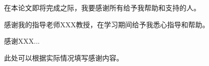 \makeacknowledgements

在本论文即将完成之际，我要感谢所有给予我帮助和支持的人。

感谢我的指导老师XXX教授，在学习期间给予我悉心指导和帮助。

感谢XXX...

此处可以根据实际情况填写感谢内容。
